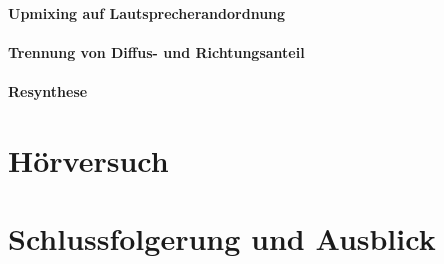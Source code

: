\documentclass[12pt, a4paper]{article}
\begin{document}
        \paragraph{Upmixing auf Lautsprecherandordnung}
        
        \paragraph{Trennung von Diffus- und Richtungsanteil}
        
        \paragraph{Resynthese}
        

\section{Hörversuch}

\section{Schlussfolgerung und Ausblick}



\end{document}
